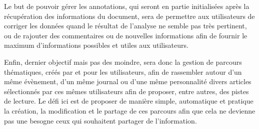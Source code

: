     Le but de pouvoir gérer les annotations, qui seront en partie initialisées après la récupération
    des informations du document, sera de permettre aux utilisateurs de corriger les données quand
    le résultat de l’analyse ne semble pas très pertinent, ou de rajouter des commentaires ou
    de nouvelles informations afin de fournir le maximum d’informations possibles et utiles aux utilisateurs.

    Enfin, dernier objectif mais pas des moindre, sera donc la gestion de parcours thématiques,
    créés par et pour les utilisateurs, afin de rassembler autour d’un même évènement,
    d’un même journal ou d’une même personnalité divers articles sélectionnés par ces mêmes utilisateurs
    afin de proposer, entre autres, des pistes de lecture. Le défi ici est de proposer de manière simple,
    automatique et pratique la création, la modification et le partage de ces parcours afin que cela
    ne devienne pas une besogne ceux qui souhaitent partager de l’information.
